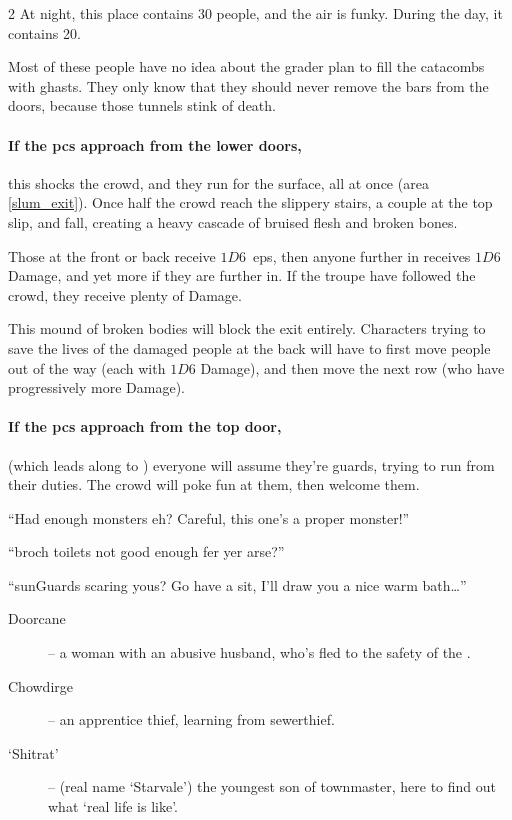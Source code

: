 \begin{multicols}{2}
At night, this place contains 30 people, and the air is funky.
During the day, it contains 20.

Most of these people have no idea about the grader plan to fill the catacombs with ghasts.
They only know that they should never remove the bars from the doors, because those tunnels stink of death.

\paragraph{If the \glspl{pc} approach from the lower doors,}
this shocks the crowd, and they run for the surface, all at once (\gls{area} \vref{slum_exit}).
Once half the crowd reach the slippery stairs, a couple at the top slip, and fall, creating a heavy cascade of bruised flesh and broken bones.

Those at the front or back receive $1D6$~\glspl{ep}, then anyone further in receives $1D6$ Damage, and yet more if they are further in.
If the troupe have followed the crowd, they receive plenty of Damage.

This mound of broken bodies will block the exit entirely.
Characters trying to save the lives of the damaged people at the back will have to first move people out of the way (each with $1D6$ Damage), and then move the next row (who have progressively more Damage).

\paragraph{If the \glspl{pc} approach from the top door,}
(which leads along to ) everyone will assume they're \glspl{guard}, trying to run from their duties.
The crowd will poke fun at them, then welcome them.

\begin{speechtext}
  ``Had enough monsters eh?
  Careful, this one's a proper monster!''

  ``\Gls{broch} toilets not good enough fer yer arse?''

  ``\Glspl{sunGuard} scaring yous?
  Go have a sit, I'll draw you a nice warm bath\ldots''
\end{speechtext}

\begin{description}
  \item[Doorcane] -- a woman with an abusive husband, who's fled to the safety of the .
  \item[Chowdirge] -- an apprentice thief, learning from \gls{sewerthief}.
  \item[`Shitrat'] -- (real name `Starvale') the youngest son of \gls{townmaster}, here to find out what `real life is like'.
\end{description}


\end{multicols}
